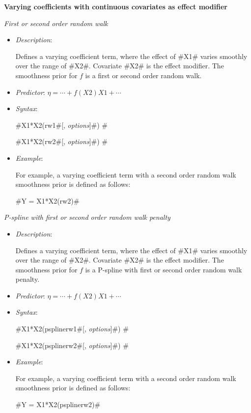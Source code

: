 {\bf Varying coefficients with continuous covariates as effect
modifier}
\medskip

{\em First or second order random walk}

\begin{itemize}
\item[] {\em Description}:

Defines a varying coefficient term, where the effect of #X1#
varies smoothly over the range of #X2#. Covariate #X2# is the
effect modifier. The smoothness prior for $f$ is a first or second
order random walk.
\item[] {\em Predictor}: $\eta= \cdots + f(X2)X1 + \cdots$
\item[] {\em Syntax}:

#X1*X2(rw1#[, {\em options}]#) #

#X1*X2(rw2#[, {\em options}]#) #
\item[] {\em Example}:

For example, a varying coefficient term with a second order random
walk smoothness prior is defined as follows:

#Y = X1*X2(rw2)#
\end{itemize}


{\em P-spline with first or second order random walk penalty}
\begin{itemize}
\item[] {\em Description}:

Defines a varying coefficient term, where the effect of #X1#
varies smoothly over the range of #X2#. Covariate #X2# is the
effect modifier. The smoothness prior for $f$ is a P-spline with
first or second order random walk penalty.
\item[] {\em Predictor}: $\eta= \cdots + f(X2)X1 + \cdots$
\item[] {\em Syntax}:

#X1*X2(psplinerw1#[, {\em options}]#) #

#X1*X2(psplinerw2#[, {\em options}]#) #
\item[] {\em Example}:

For example, a varying coefficient term with a second order random
walk smoothness prior is defined as follows:

#Y = X1*X2(psplinerw2)#

\end{itemize}



